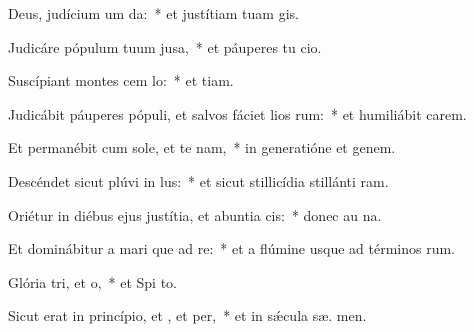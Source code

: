 \item Deus, judícium um  da:~* et justítiam tuam  gis.
\item Judicáre pópulum tuum  jusa,~* et páuperes tu  cio.
\item Suscípiant montes cem lo:~* et  tiam.
\item Judicábit páuperes pópuli, et salvos fáciet lios rum:~* et humiliábit carem.
\item Et permanébit cum sole, et te nam,~* in generatióne et genem.
\item Descéndet sicut plúvi in lus:~* et sicut stillicídia stillánti  ram.
\item Oriétur in diébus ejus justítia, et abuntia cis:~* donec au na.
\item Et dominábitur a mari que ad re:~* et a flúmine usque ad términos  rum.
\item Glória tri, et o,~* et Spi to.
\item Sicut erat in princípio, et , et per,~* et in sǽcula sæ. men.
